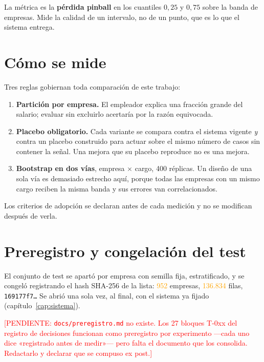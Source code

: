\documentclass[12pt,a4paper,oneside]{report}
\newcommand{\pend}[1]{\textcolor{red}{\small[PENDIENTE: #1]}}
\newcommand{\verificar}[1]{\textcolor{orange}{#1}}
\begin{document}
La métrica es la \textbf{pérdida pinball} en los cuantiles $0{,}25$ y $0{,}75$ sobre la
banda de empresas. Mide la calidad de un intervalo, no de un punto, que es lo que el
sistema entrega.

\section{Cómo se mide}

Tres reglas gobiernan toda comparación de este trabajo:

\begin{enumerate}[leftmargin=2em]
  \item \textbf{Partición por empresa.} El empleador explica una fracción grande del
    salario; evaluar sin excluirlo acertaría por la razón equivocada.
  \item \textbf{Placebo obligatorio.} Cada variante se compara contra el sistema vigente
    \emph{y} contra un placebo construido para actuar sobre el mismo número de casos sin
    contener la señal. Una mejora que su placebo reproduce no es una mejora.
  \item \textbf{Bootstrap en dos vías}, empresa $\times$ cargo, 400 réplicas. Un diseño
    de una sola vía es demasiado estrecho aquí, porque todas las empresas con un mismo
    cargo reciben la misma banda y sus errores van correlacionados.
\end{enumerate}

Los criterios de adopción se declaran antes de cada medición y no se modifican después de
verla.

\section{Preregistro y congelación del test}

El conjunto de test se apartó por empresa con semilla fija, estratificado, y se congeló
registrando el hash SHA-256 de la lista: \verificar{952} empresas, \verificar{136.834}
filas, \texttt{169177f7\ldots}
Se abrió una sola vez, al final, con el sistema ya fijado (capítulo~\ref{cap:sistema}).

\pend{\texttt{docs/preregistro.md} no existe. Los 27 bloques T-0xx del registro de
decisiones funcionan como preregistro por experimento ---cada uno dice «registrado antes
de medir»--- pero falta el documento que los consolida. Redactarlo y declarar que se
compuso ex post.}

\end{document}
